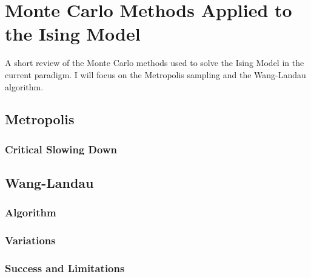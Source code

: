 \chapter{Monte Carlo Methods Applied to the Ising Model}

A short review of the Monte Carlo methods used to solve the Ising Model in the current paradigm. I will focus on the Metropolis sampling and the Wang-Landau algorithm.

\section{Metropolis}

\subsection{Critical Slowing Down}


\section{Wang-Landau}

\subsection{Algorithm}

\subsection{Variations}

\subsection{Success and Limitations}
